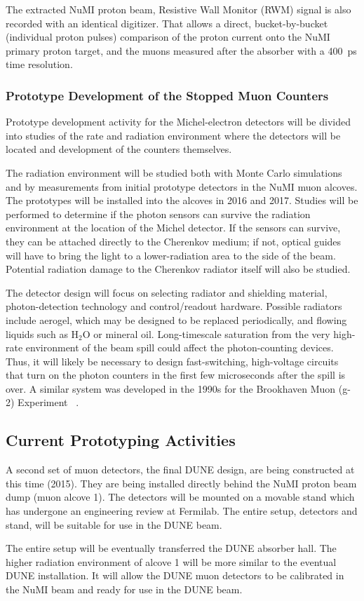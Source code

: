 The extracted NuMI proton beam, Resistive Wall Monitor (RWM) signal is
also recorded with an identical digitizer. That allows a direct,
bucket-by-bucket (individual proton pulses) comparison of the proton
current onto the NuMI primary proton target, and the muons measured
after the absorber with a 400~ps time resolution.



\subsubsection{Prototype Development of the Stopped Muon Counters}

Prototype development activity for the Michel-electron detectors will
be divided into studies of the rate and radiation environment where
the detectors will be located and development of the counters
themselves. 

The radiation environment will be studied both with Monte Carlo 
simulations and by measurements from initial prototype detectors 
in the NuMI muon alcoves\cite{ref:NuMIBeamMonitors}.
The prototypes will be installed into the alcoves in 2016 and 2017.
Studies will be performed to determine if the photon sensors
can survive the radiation environment at the location of the Michel
detector. If the sensors can survive, they can be attached directly to
the Cherenkov medium; if not, optical guides will have to bring the
light to a lower-radiation area to the side of the beam. Potential
radiation damage to the Cherenkov radiator itself will also be
studied.

The detector design will focus on selecting radiator and shielding
material, photon-detection technology and control/readout
hardware. Possible radiators include aerogel, which may be designed to
be replaced periodically, and flowing liquids such as H$_2$O or
mineral oil. Long-timescale saturation from the very high-rate
environment of the beam spill could affect the photon-counting
devices\cite{ref:HighRateCounting}. Thus, it will likely be necessary
to design fast-switching, high-voltage circuits that turn on the
photon counters in the first few microseconds after the spill is
over. A similar system was developed in the 1990s for the Brookhaven
Muon (g-2) Experiment~\cite{ref:G2} .

\subsection{Current Prototyping Activities}

A second set of muon detectors, the final DUNE design, are being
constructed at this time (2015). They are being installed directly
behind the NuMI proton beam dump (muon alcove 1). The detectors will
be mounted on a movable stand which has undergone an engineering
review at Fermilab. The entire setup, detectors and stand, will be
suitable for use in the DUNE beam.

The entire setup will be eventually transferred the DUNE absorber
hall. The higher radiation environment of alcove 1 will be more
similar to the eventual DUNE installation. It will allow the DUNE muon
detectors to be calibrated in the NuMI beam and ready for use in the
DUNE beam.
